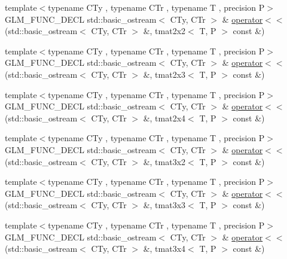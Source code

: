\begin{DoxyCompactItemize}
\item 
{\footnotesize template$<$typename C\+Ty , typename C\+Tr , typename T , precision P$>$ }\\G\+L\+M\+\_\+\+F\+U\+N\+C\+\_\+\+D\+E\+C\+L std\+::basic\+\_\+ostream$<$ C\+Ty, C\+Tr $>$ \& \hyperlink{group__gtx__io_ga61fbdb6ad70c4c8d750a847251fa4a4a}{operator$<$$<$} (std\+::basic\+\_\+ostream$<$ C\+Ty, C\+Tr $>$ \&, tmat2x2$<$ T, P $>$ const \&)
\item 
{\footnotesize template$<$typename C\+Ty , typename C\+Tr , typename T , precision P$>$ }\\G\+L\+M\+\_\+\+F\+U\+N\+C\+\_\+\+D\+E\+C\+L std\+::basic\+\_\+ostream$<$ C\+Ty, C\+Tr $>$ \& \hyperlink{group__gtx__io_ga032043616f87c7eefaf4d83a20f779a5}{operator$<$$<$} (std\+::basic\+\_\+ostream$<$ C\+Ty, C\+Tr $>$ \&, tmat2x3$<$ T, P $>$ const \&)
\item 
{\footnotesize template$<$typename C\+Ty , typename C\+Tr , typename T , precision P$>$ }\\G\+L\+M\+\_\+\+F\+U\+N\+C\+\_\+\+D\+E\+C\+L std\+::basic\+\_\+ostream$<$ C\+Ty, C\+Tr $>$ \& \hyperlink{group__gtx__io_ga1a2314cab31da0e736bc5e601bcb8f37}{operator$<$$<$} (std\+::basic\+\_\+ostream$<$ C\+Ty, C\+Tr $>$ \&, tmat2x4$<$ T, P $>$ const \&)
\item 
{\footnotesize template$<$typename C\+Ty , typename C\+Tr , typename T , precision P$>$ }\\G\+L\+M\+\_\+\+F\+U\+N\+C\+\_\+\+D\+E\+C\+L std\+::basic\+\_\+ostream$<$ C\+Ty, C\+Tr $>$ \& \hyperlink{group__gtx__io_gac825ec168ada9209dad314bca460ceef}{operator$<$$<$} (std\+::basic\+\_\+ostream$<$ C\+Ty, C\+Tr $>$ \&, tmat3x2$<$ T, P $>$ const \&)
\item 
{\footnotesize template$<$typename C\+Ty , typename C\+Tr , typename T , precision P$>$ }\\G\+L\+M\+\_\+\+F\+U\+N\+C\+\_\+\+D\+E\+C\+L std\+::basic\+\_\+ostream$<$ C\+Ty, C\+Tr $>$ \& \hyperlink{group__gtx__io_ga3ea3ca90bea2e763079f09af1e5d50ab}{operator$<$$<$} (std\+::basic\+\_\+ostream$<$ C\+Ty, C\+Tr $>$ \&, tmat3x3$<$ T, P $>$ const \&)
\item 
{\footnotesize template$<$typename C\+Ty , typename C\+Tr , typename T , precision P$>$ }\\G\+L\+M\+\_\+\+F\+U\+N\+C\+\_\+\+D\+E\+C\+L std\+::basic\+\_\+ostream$<$ C\+Ty, C\+Tr $>$ \& \hyperlink{group__gtx__io_ga5a5ca6f99c027a2277b24de487198fe0}{operator$<$$<$} (std\+::basic\+\_\+ostream$<$ C\+Ty, C\+Tr $>$ \&, tmat3x4$<$ T, P $>$ const \&)
\item 

\end{DoxyCompactItemize}

